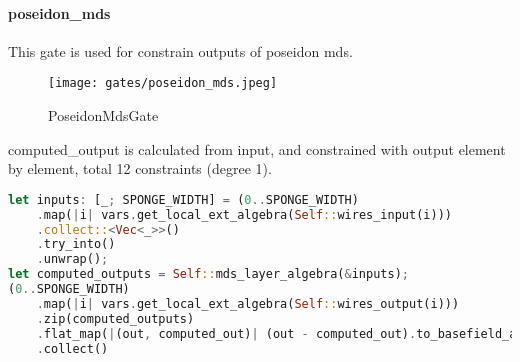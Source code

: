 \paragraph{poseidon\_mds}

This gate is used for constrain outputs of poseidon mds.

\begin{figure}[!h]
    \centering
    \texttt{[image: gates/poseidon\_mds.jpeg]}
    \caption{PoseidonMdsGate}
    \label{fig:poseidon-mds}
\end{figure}

computed\_output is calculated from input, and constrained with output element by element, total 12 constraints (degree 1).
\begin{lstlisting}[language=rust]
let inputs: [_; SPONGE_WIDTH] = (0..SPONGE_WIDTH)
    .map(|i| vars.get_local_ext_algebra(Self::wires_input(i)))
    .collect::<Vec<_>>()
    .try_into()
    .unwrap();
let computed_outputs = Self::mds_layer_algebra(&inputs);
(0..SPONGE_WIDTH)
    .map(|i| vars.get_local_ext_algebra(Self::wires_output(i)))
    .zip(computed_outputs)
    .flat_map(|(out, computed_out)| (out - computed_out).to_basefield_array())
    .collect()
\end{lstlisting}

